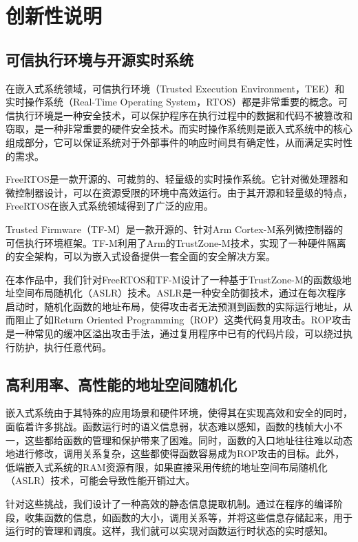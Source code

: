 \documentclass[UTF8,12pt,a4paper]{ctexart}
\numberwithin{figure}{section}
\begin{document}
\section{创新性说明}
\subsection{可信执行环境与开源实时系统}
\par 在嵌入式系统领域，可信执行环境（Trusted Execution Environment，TEE）和实时操作系统（Real-Time Operating System，RTOS）都是非常重要的概念。可信执行环境是一种安全技术，可以保护程序在执行过程中的数据和代码不被篡改和窃取，是一种非常重要的硬件安全技术。而实时操作系统则是嵌入式系统中的核心组成部分，它可以保证系统对于外部事件的响应时间具有确定性，从而满足实时性的需求。

\par FreeRTOS是一款开源的、可裁剪的、轻量级的实时操作系统。它针对微处理器和微控制器设计，可以在资源受限的环境中高效运行。由于其开源和轻量级的特点，FreeRTOS在嵌入式系统领域得到了广泛的应用。

\par Trusted Firmware（TF-M）是一款开源的、针对Arm Cortex-M系列微控制器的可信执行环境框架。TF-M利用了Arm的TrustZone-M技术，实现了一种硬件隔离的安全架构，可以为嵌入式设备提供一套全面的安全解决方案。

\par 在本作品中，我们针对FreeRTOS和TF-M设计了一种基于TrustZone-M的函数级地址空间布局随机化（ASLR）技术。ASLR是一种安全防御技术，通过在每次程序启动时，随机化函数的地址布局，使得攻击者无法预测到函数的实际运行地址，从而阻止了如Return Oriented Programming（ROP）这类代码复用攻击。ROP攻击是一种常见的缓冲区溢出攻击手法，通过复用程序中已有的代码片段，可以绕过执行防护，执行任意代码。

\subsection{高利用率、高性能的地址空间随机化}
\par 嵌入式系统由于其特殊的应用场景和硬件环境，使得其在实现高效和安全的同时，面临着许多挑战。函数运行时的语义信息弱，状态难以感知，函数的栈帧大小不一，这些都给函数的管理和保护带来了困难。同时，函数的入口地址往往难以动态地进行修改，调用关系复杂，这些都使得函数容易成为ROP攻击的目标。此外，低端嵌入式系统的RAM资源有限，如果直接采用传统的地址空间布局随机化（ASLR）技术，可能会导致性能开销过大。

\par 针对这些挑战，我们设计了一种高效的静态信息提取机制。通过在程序的编译阶段，收集函数的信息，如函数的大小，调用关系等，并将这些信息存储起来，用于运行时的管理和调度。这样，我们就可以实现对函数运行时状态的实时感知。
\end{document}
